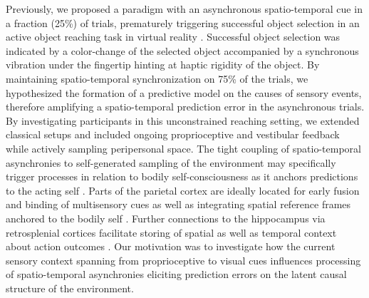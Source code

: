 Previously, we proposed a paradigm with an asynchronous spatio-temporal cue in a fraction (25\%) of trials, prematurely triggering successful object selection in an active object reaching task in virtual reality \cite{Gehrke2019}. Successful object selection was indicated by a color-change of the selected object accompanied by a synchronous vibration under the fingertip hinting at haptic rigidity of the object. By maintaining spatio-temporal synchronization on 75\% of the trials, we hypothesized the formation of a predictive model on the causes of sensory events, therefore amplifying a spatio-temporal prediction error in the asynchronous trials. By investigating participants in this unconstrained reaching setting, we extended classical setups and included ongoing proprioceptive and vestibular feedback while actively sampling peripersonal space. The tight coupling of spatio-temporal asynchronies to self-generated sampling of the environment may specifically trigger processes in relation to bodily self-consciousness as it anchors predictions to the acting self \cite{Blanke2015, Guterstam2015a}. Parts of the parietal cortex are ideally located for early fusion and binding of multisensory cues as well as integrating spatial reference frames anchored to the bodily self \cite{Clark2018, Gramann2009}. Further connections to the hippocampus via retrosplenial cortices facilitate storing of spatial as well as temporal context about action outcomes \cite{Pearson2011}. Our motivation was to investigate how the current sensory context spanning from proprioceptive to visual cues influences processing of spatio-temporal asynchronies eliciting prediction errors on the latent causal structure of the environment.





































